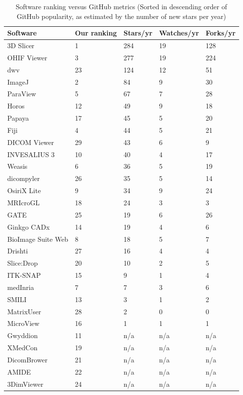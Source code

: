 \documentclass[final, 3p, times, authoryear]{elsarticle}
\begin{document}
\begingroup
\renewcommand{\arraystretch}{0.85}
\begin{table}[!ht]
\centering
\begin{tabular}{lllll}
\hline
Software & Our ranking & Stars/yr & Watches/yr & Forks/yr \\ \hline
3D Slicer & 1 & 284 & 19 & 128 \\
OHIF Viewer & 3 & 277 & 19 & 224 \\
dwv & 23 & 124 & 12 & 51 \\
ImageJ & 2 & 84 & 9 & 30 \\
ParaView & 5 & 67 & 7 & 28 \\
Horos & 12 & 49 & 9 & 18 \\
Papaya & 17 & 45 & 5 & 20 \\
Fiji & 4 & 44 & 5 & 21 \\
DICOM Viewer & 29 & 43 & 6 & 9 \\
INVESALIUS 3 & 10 & 40 & 4 & 17 \\
Weasis & 6 & 36 & 5 & 19 \\
dicompyler & 26 & 35 & 5 & 14 \\
OsiriX Lite & 9 & 34 & 9 & 24 \\
MRIcroGL & 18 & 24 & 3 & 3 \\
GATE & 25 & 19 & 6 & 26 \\
Ginkgo CADx & 14 & 19 & 4 & 6 \\
BioImage Suite Web & 8 & 18 & 5 & 7 \\
Drishti & 27 & 16 & 4 & 4 \\
Slice:Drop & 20 & 10 & 2 & 5 \\
ITK-SNAP & 15 & 9 & 1 & 4 \\
medInria & 7 & 7 & 3 & 6 \\
SMILI & 13 & 3 & 1 & 2 \\
MatrixUser & 28 & 2 & 0 & 0 \\
MicroView & 16 & 1 & 1 & 1 \\
Gwyddion & 11 & n/a & n/a & n/a \\
XMedCon & 19 & n/a & n/a & n/a \\
DicomBrower & 21 & n/a & n/a & n/a \\
AMIDE & 22 & n/a & n/a & n/a \\
3DimViewer & 24 & n/a & n/a & n/a \\ \hline
\end{tabular}
\caption{\label{tab_ranking_vs_GitHub}Software ranking versus GitHub metrics
(Sorted in descending order of GitHub popularity, as estimated by the number of
new stars per year)}
\end{table}
\endgroup
\end{document}
